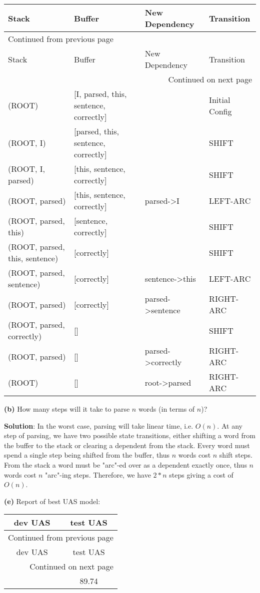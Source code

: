 \documentclass[10pt]{article}
\begin{document}
\begin{longtable}{|l|l|l|l|}
Stack & Buffer & New Dependency & Transition\\
\hline
\endfirsthead
\multicolumn{4}{l}{Continued from previous page} \\
\hline

Stack & Buffer & New Dependency & Transition \\

\hline
\endhead
\hline\multicolumn{4}{r}{Continued on next page} \\
\endfoot
\endlastfoot
\hline
(ROOT) & [I, parsed, this, sentence, correctly] &  & Initial Config\\
(ROOT, I) & [parsed, this, sentence, correctly] &  & SHIFT\\
(ROOT, I, parsed) & [this, sentence, correctly] &  & SHIFT\\
(ROOT, parsed) & [this, sentence, correctly] & parsed->I & LEFT-ARC\\
(ROOT, parsed, this) & [sentence, correctly] &  & SHIFT\\
(ROOT, parsed, this, sentence) & [correctly] &  & SHIFT\\
(ROOT, parsed, sentence) & [correctly] & sentence->this & LEFT-ARC\\
(ROOT, parsed) & [correctly] & parsed->sentence & RIGHT-ARC\\
(ROOT, parsed, correctly) & [] &  & SHIFT\\
(ROOT, parsed) & [] & parsed->correctly & RIGHT-ARC\\
(ROOT) & [] & root->parsed & RIGHT-ARC\\
\end{longtable}

\textbf{(b)} How many steps will it take to parse \(n\) words (in terms of \(n\))?

\textbf{Solution}: In the worst case, parsing will take linear time, i.e. \(O(n)\). At any step of parsing, we have two possible
state transitions, either shifting a word from the buffer to the stack or clearing a dependent from the stack. Every 
word must spend a single step being shifted from the buffer, thus \(n\) words cost \(n\) shift steps. From the stack a 
word must be "arc"-ed over as a dependent exactly once, thus \(n\) words cost \(n\) "arc"-ing steps. Therefore, we have 
\(2*n\) steps giving a cost of \(O(n)\).


\textbf{(e)} Report of best UAS model:

\begin{longtable}{|c|c|}
dev UAS & test UAS\\
\hline
\endfirsthead
\multicolumn{2}{l}{Continued from previous page} \\
\hline

dev UAS & test UAS \\

\hline
\endhead
\hline\multicolumn{2}{r}{Continued on next page} \\
\endfoot
\endlastfoot
\hline
89.60 & 89.74\\
\end{longtable}
\end{document}
